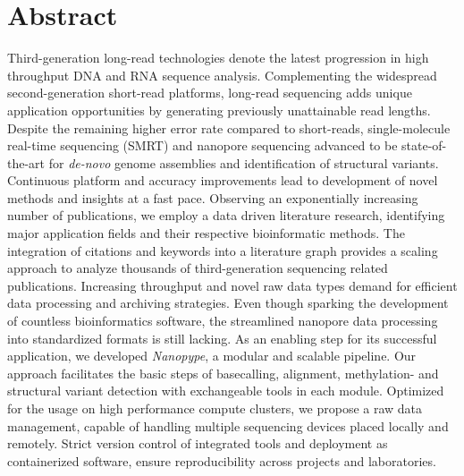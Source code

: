 
\vspace*{10mm}
\section*{Abstract}
\label{sec:abstract}


Third-generation long-read technologies denote the latest progression in high throughput DNA and RNA sequence analysis.
Complementing the widespread second-generation short-read platforms, long-read sequencing adds unique application opportunities by generating previously unattainable read lengths.
Despite the remaining higher error rate compared to short-reads, single-molecule real-time sequencing (SMRT) and nanopore sequencing advanced to be state-of-the-art for \textit{de-novo} genome assemblies and identification of structural variants.
Continuous platform and accuracy improvements lead to development of novel methods and insights at a fast pace.
Observing an exponentially increasing number of publications, we employ a data driven literature research, identifying major application fields and their respective bioinformatic methods.
The integration of citations and keywords into a literature graph provides a scaling approach to analyze thousands of third-generation sequencing related publications.
Increasing throughput and novel raw data types demand for efficient data processing and archiving strategies.
Even though sparking the development of countless bioinformatics software, the streamlined nanopore data processing into standardized formats is still lacking.
As an enabling step for its successful application, we developed \textit{Nanopype}, a modular and scalable pipeline. 
Our approach facilitates the basic steps of basecalling, alignment, methylation- and structural variant detection with exchangeable tools in each module.
Optimized for the usage on high performance compute clusters, we propose a raw data management, capable of handling multiple sequencing devices placed locally and remotely.
Strict version control of integrated tools and deployment as containerized software, ensure reproducibility across projects and laboratories.
